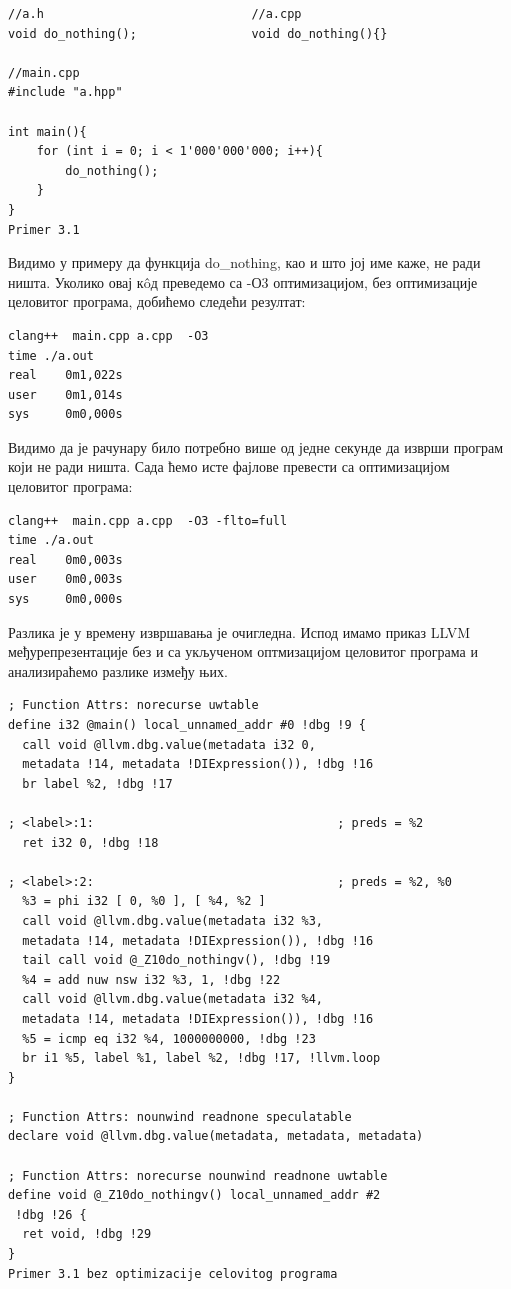 \documentclass[12pt,oneside]{memoir}
\begin{document}
\begin{lstlisting}[frame=single]
//a.h                             //a.cpp
void do_nothing();                void do_nothing(){} 

//main.cpp          
#include "a.hpp"

int main(){
    for (int i = 0; i < 1'000'000'000; i++){
        do_nothing();
    }
}
Primer 3.1
\end{lstlisting}

Видимо у примеру да функција  do{\_}nothing, као и што јој име каже, не ради ништа.
Уколико овај к\^{o}д преведемо са -О3 оптимизацијом, без оптимизације целовитог програма, добићемо следећи резултат:

\begin{lstlisting}[frame=single]
clang++  main.cpp a.cpp  -O3
time ./a.out 
real    0m1,022s
user    0m1,014s
sys     0m0,000s
\end{lstlisting}
Видимо да је рачунару било потребно више од једне секунде да изврши програм који не ради ништа.
Сада ћемо исте фајлове превести са оптимизацијом целовитог програма:
\begin{lstlisting}[frame=single]
clang++  main.cpp a.cpp  -O3 -flto=full
time ./a.out 
real    0m0,003s
user    0m0,003s
sys     0m0,000s
\end{lstlisting}

Разлика је у времену извршавања је очигледна.
Испод имамо приказ LLVM међурепрезентације без и са укљученом оптмизацијом целовитог програма
и анализираћемо разлике између њих.
\begin{lstlisting}[frame=single]
; Function Attrs: norecurse uwtable
define i32 @main() local_unnamed_addr #0 !dbg !9 {
  call void @llvm.dbg.value(metadata i32 0, 
  metadata !14, metadata !DIExpression()), !dbg !16
  br label %2, !dbg !17

; <label>:1:                                  ; preds = %2
  ret i32 0, !dbg !18

; <label>:2:                                  ; preds = %2, %0
  %3 = phi i32 [ 0, %0 ], [ %4, %2 ]
  call void @llvm.dbg.value(metadata i32 %3, 
  metadata !14, metadata !DIExpression()), !dbg !16
  tail call void @_Z10do_nothingv(), !dbg !19
  %4 = add nuw nsw i32 %3, 1, !dbg !22
  call void @llvm.dbg.value(metadata i32 %4,
  metadata !14, metadata !DIExpression()), !dbg !16
  %5 = icmp eq i32 %4, 1000000000, !dbg !23
  br i1 %5, label %1, label %2, !dbg !17, !llvm.loop
}

; Function Attrs: nounwind readnone speculatable
declare void @llvm.dbg.value(metadata, metadata, metadata)

; Function Attrs: norecurse nounwind readnone uwtable
define void @_Z10do_nothingv() local_unnamed_addr #2 
 !dbg !26 {
  ret void, !dbg !29
}
Primer 3.1 bez optimizacije celovitog programa
\end{lstlisting}
\end{document}
